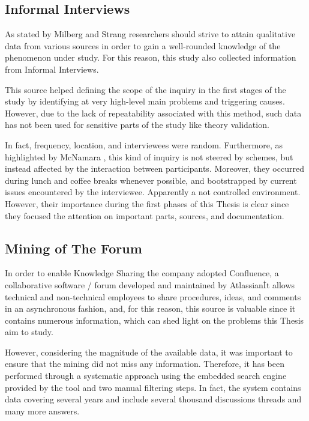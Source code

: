 \subsection{Informal Interviews}
As stated by Milberg and Strang \cite{informal_interview} researchers should strive to attain qualitative data from various sources in order to gain a well-rounded knowledge of the phenomenon under study. For this reason, this study also collected information from Informal Interviews.

This source helped defining the scope of the inquiry in the first stages of the study by identifying at very high-level main problems and triggering causes. However, due to the lack of repeatability associated with this method, such data has not been used for sensitive parts of the study like theory validation.

In fact, frequency, location, and interviewees were random. Furthermore, as highlighted by McNamara \cite{general_guidelines_for_interview}, this kind of inquiry is not steered by schemes, but instead affected by the interaction between participants. Moreover, they occurred during lunch and coffee breaks whenever possible, and bootstrapped by current issues encountered by the interviewee. Apparently a not controlled environment. However, their importance during the first phases of this Thesis is clear since they focused the attention on important parts, sources, and documentation.

\subsection{Mining of The Forum} \label{mining_forum}
In order to enable Knowledge Sharing the company adopted Confluence, a collaborative software / forum developed and maintained by Atlassian\texttrademark\. It allows technical and non-technical employees to share procedures, ideas, and comments in an asynchronous fashion, and, for this reason, this source is valuable since it contains numerous information, which can shed light on the problems this Thesis aim to study.

However, considering the magnitude of the available data, it was important to ensure that the mining did not miss any information. Therefore, it has been performed through a systematic approach using the embedded search engine provided by the tool and two manual filtering steps. In fact, the system contains data covering several years and include several thousand discussions threads and many more answers.

